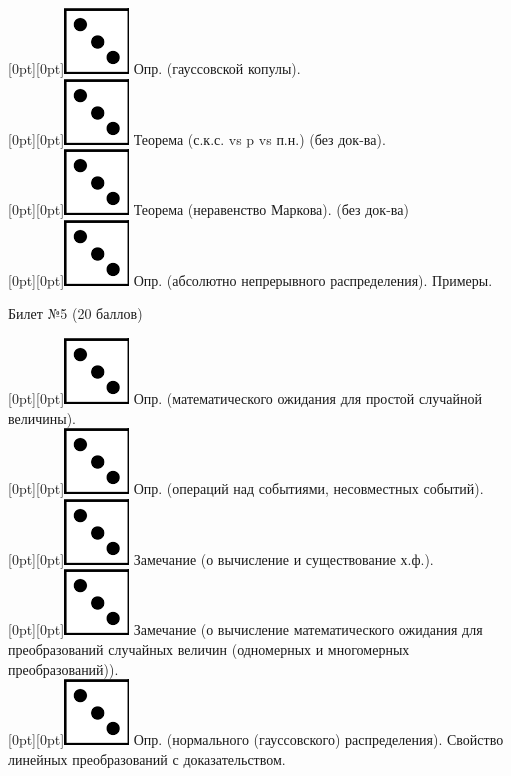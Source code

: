 \documentclass[10pt]{article}
\begin{document}
\raisebox{-1pt}[0pt][0pt]{\includegraphics[width=0.02\linewidth]{3.png}} Опр. (гауссовской копулы). \\
\raisebox{-1pt}[0pt][0pt]{\includegraphics[width=0.02\linewidth]{3.png}} Теорема (с.к.с. vs p vs п.н.) (без док-ва). \\ 
\raisebox{-1pt}[0pt][0pt]{\includegraphics[width=0.02\linewidth]{3.png}} Теорема (неравенство Маркова). (без док-ва) \\
\raisebox{-1pt}[0pt][0pt]{\includegraphics[width=0.02\linewidth]{3.png}} Опр. (абсолютно непрерывного распределения). Примеры. \\
\begin{center} {\Large Билет №5 (20 баллов)} \end{center}
\raisebox{-1pt}[0pt][0pt]{\includegraphics[width=0.02\linewidth]{3.png}} Опр. (математического ожидания для простой случайной величины). \\
\raisebox{-1pt}[0pt][0pt]{\includegraphics[width=0.02\linewidth]{3.png}} Опр. (операций над событиями, несовместных событий). \\
\raisebox{-1pt}[0pt][0pt]{\includegraphics[width=0.02\linewidth]{3.png}} Замечание (о вычисление и существование х.ф.). \\
\raisebox{-1pt}[0pt][0pt]{\includegraphics[width=0.02\linewidth]{3.png}} Замечание (о вычисление  математического ожидания для преобразований случайных величин (одномерных и многомерных преобразований)). \\
\raisebox{-1pt}[0pt][0pt]{\includegraphics[width=0.02\linewidth]{3.png}}  Опр. (нормального (гауссовского) распределения). Свойство линейных преобразований с доказательством. \\
\end{document}
